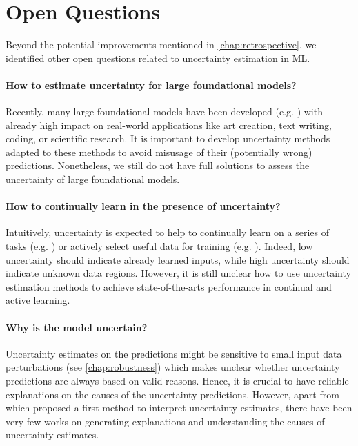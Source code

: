 \section{Open Questions}

Beyond the potential improvements mentioned in \cref{chap:retrospective}, we identified other open questions related to uncertainty estimation in ML.

\paragraph{How to estimate uncertainty for large foundational models?} Recently, many large foundational models have been developed (e.g. \cite{gpt, rombach2021highresolution, galactica}) with already high impact on real-world applications like art creation, text writing, coding, or scientific research. It is important to develop uncertainty methods adapted to these methods to avoid misusage of their (potentially wrong) predictions. Nonetheless, we still do not have full solutions to assess the uncertainty of large foundational models.

\paragraph{How to continually learn in the presence of uncertainty?} Intuitively, uncertainty is expected to help to continually learn on a series of tasks (e.g. \cite{ebrahimi2020uncertainty-guided,khan2021knowledge}) or actively select useful data for training (e.g. \cite{jain2022biological,gal2017bald,kirsch2019batch,tata2022can}). Indeed, low uncertainty should indicate already learned inputs, while high uncertainty should indicate unknown data regions. However, it is still unclear how to use uncertainty estimation methods to achieve state-of-the-arts performance in continual and active learning.

\paragraph{Why is the model uncertain?} Uncertainty estimates on the predictions might be sensitive to small input data perturbations (see \cref{chap:robustness}) which makes unclear whether uncertainty predictions are always based on valid reasons. Hence, it is crucial to have reliable explanations on the causes of the uncertainty predictions. However, apart from \cite{antoran2021getting} which proposed a first method to interpret uncertainty estimates, there have been very few works on generating explanations and understanding the causes of uncertainty estimates. 

